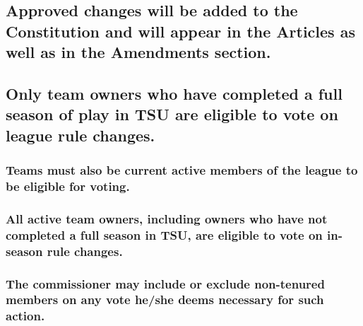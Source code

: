 \documentclass[
]{book}
\begin{document}
\hypertarget{approved-changes-will-be-added-to-the-constitution-and-will-appear-in-the-articles-as-well-as-in-the-amendments-section.}{%
\subsection{Approved changes will be added to the Constitution and will appear in the Articles as well as in the Amendments section.}\label{approved-changes-will-be-added-to-the-constitution-and-will-appear-in-the-articles-as-well-as-in-the-amendments-section.}}

\hypertarget{only-team-owners-who-have-completed-a-full-season-of-play-in-tsu-are-eligible-to-vote-on-league-rule-changes.}{%
\subsection{Only team owners who have completed a full season of play in TSU are eligible to vote on league rule changes.}\label{only-team-owners-who-have-completed-a-full-season-of-play-in-tsu-are-eligible-to-vote-on-league-rule-changes.}}

\hypertarget{teams-must-also-be-current-active-members-of-the-league-to-be-eligible-for-voting.}{%
\subsubsection{Teams must also be current active members of the league to be eligible for voting.}\label{teams-must-also-be-current-active-members-of-the-league-to-be-eligible-for-voting.}}

\hypertarget{all-active-team-owners-including-owners-who-have-not-completed-a-full-season-in-tsu-are-eligible-to-vote-on-in-season-rule-changes.}{%
\subsubsection{All active team owners, including owners who have not completed a full season in TSU, are eligible to vote on in-season rule changes.}\label{all-active-team-owners-including-owners-who-have-not-completed-a-full-season-in-tsu-are-eligible-to-vote-on-in-season-rule-changes.}}

\hypertarget{the-commissioner-may-include-or-exclude-non-tenured-members-on-any-vote-heshe-deems-necessary-for-such-action.}{%
\subsubsection{The commissioner may include or exclude non-tenured members on any vote he/she deems necessary for such action.}\label{the-commissioner-may-include-or-exclude-non-tenured-members-on-any-vote-heshe-deems-necessary-for-such-action.}}
\end{document}
